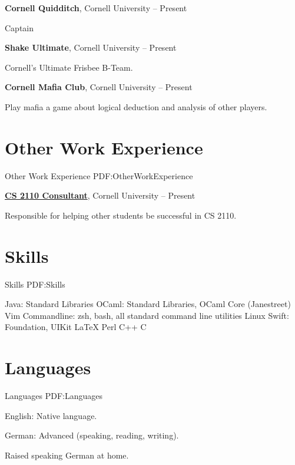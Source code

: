 \documentclass[letterpaper,10pt,oneside]{simpleresumecv}
\begin{document}
\begin{body}
{\textbf{Cornell Quidditch}},
Cornell University
\hfill
{} --
Present

\GapNoBreak%
\BulletItem%
Captain

{\textbf{Shake Ultimate}},
Cornell University
\hfill
{} --
Present

\GapNoBreak%
\BulletItem%
Cornell's Ultimate Frisbee B-Team.

{\textbf{Cornell Mafia Club}},
Cornell University
\hfill
{} --
Present

\GapNoBreak%
\BulletItem%
Play mafia a game about logical deduction and analysis of other players.


\section%
{Other Work\newline
Experience}
{Other Work Experience}
{PDF:OtherWorkExperience}

\href{http://www.example.com/my-company}
{\textbf{CS 2110 Consultant}},
Cornell University
\hfill
{} --
Present

\GapNoBreak%
\BulletItem%
Responsible for helping other students be successful in CS 2110.


\section%
{Skills}
{Skills}
{PDF:Skills}

\BulletItem%
Java: Standard Libraries
\BulletItem%
OCaml: Standard Libraries, OCaml Core (Janestreet)
\BulletItem%
Vim
\BulletItem%
Commandline: zsh, bash, all standard command line utilities
\BulletItem%
Linux
\BulletItem%
Swift: Foundation, UIKit
\BulletItem%
{\LaTeX}
\BulletItem%
Perl
\BulletItem%
C++
\BulletItem%
C


\section%
{Languages}
{Languages}
{PDF:Languages}

\BulletItem%
English: Native language.

\GapNoBreak%
\BulletItem%
German: Advanced (speaking, reading, writing).
\begin{detail}
\SubBulletItem%
Raised speaking German at home.
\end{detail}


\end{body}
\end{document}
